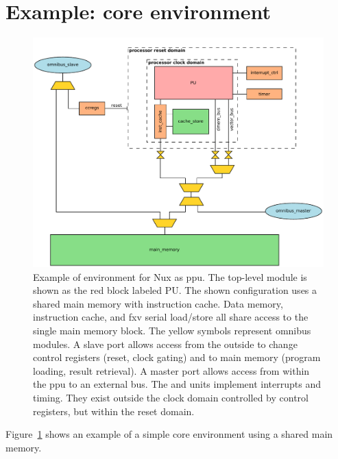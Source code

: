 \section{Example: core environment}

\begin{figure}
    \begin{center}
        \includegraphics[width=\textwidth]{figures/ppu.pdf}
    \end{center}
    \caption[PPU instantiation example with environment]{%
        Example of environment for Nux as \gls{ppu}.
        The top-level module  is shown as the red block labeled PU.
        The shown configuration uses a shared main memory with instruction cache.
        Data memory, instruction cache, and \gls{fxv} serial load/store all share access to the single main memory block.
        The yellow symbols represent \gls{omnibus} modules.
        A slave port allows access from the outside to change control registers (reset, clock gating) and to main memory (program loading, result retrieval).
        A master port allows access from within the \gls{ppu} to an external bus.
        The  and  units implement interrupts and timing.
        They exist outside the clock domain controlled by control registers, but within the reset domain.
    }
    \label{fig:ppuinst}
\end{figure}

Figure~\ref{fig:ppuinst} shows an example of a simple core environment using a shared main memory.
